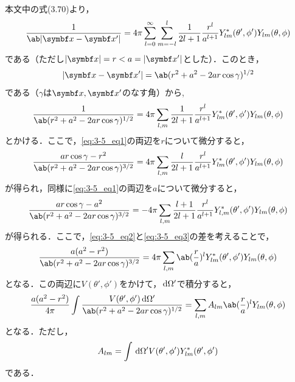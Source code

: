   \hrulefill\\
  本文中の式(3.70)より，
  \begin{gather}%
    \frac{1}{\ab|\bs{x}-\bs{x}'|} = 4\pi \sum_{l=0}^\infty \sum_{m=-l}^l \frac{1}{2l+1}
    \frac{r^l}{a^{l+1}} Y^*_{lm}(\theta',\phi') Y_{lm}(\theta,\phi)
  \end{gather}%
  である（ただし$|\bs{x}| = r < a = |\bs{x}'|$とした）．このとき，
  \begin{gather*}%
    |\bs{x} - \bs{x}'| = \ab(r^2 + a^2 - 2ar\cos\gamma)^{1/2}
  \end{gather*}%
  である（$\gamma$は$\bs{x}, \bs{x}'$のなす角）から,
  \begin{gather}%
    \label{eq:3-5_eq1}
    \frac{1}{\ab(r^2 + a^2 - 2ar \cos\gamma)^{1/2}} = 4\pi\sum_{l,m} \frac{1}{2l+1}
    \frac{r^l}{a^{l+1}} Y^*_{lm}(\theta',\phi') Y_{lm}(\theta,\phi)
  \end{gather}%
  とかける．ここで，\eqref{eq:3-5_eq1}の両辺を$r$について微分すると，
  \begin{gather}%
    \label{eq:3-5_eq2}
    \frac{ar\cos\gamma - r^2}{\ab(r^2+a^2-2ar\cos\gamma)^{3/2}} = 4\pi \sum_{l,m}
    \frac{l}{2l+1} \frac{r^l}{a^{l+1}} Y^*_{lm}(\theta',\phi') Y_{lm}(\theta,\phi)
  \end{gather}%
  が得られ，同様に\eqref{eq:3-5_eq1}の両辺を$a$について微分すると，
  \begin{gather}%
    \label{eq:3-5_eq3}
    \frac{ar\cos\gamma - a^2}{\ab(r^2 + a^2 -2ar\cos\gamma)^{3/2}} = 
    -4\pi\sum_{l,m}\frac{l+1}{2l+1}\frac{r^l}{a^{l+1}}
    Y^*_{l,m}(\theta',\phi') Y_{lm}(\theta,\phi)
  \end{gather}%
  が得られる．ここで，\eqref{eq:3-5_eq2}と\eqref{eq:3-5_eq3}の差を考えることで，
  \begin{gather}%
    \frac{a(a^2 - r^2)}{\ab(r^2 + a^2 - 2ar\cos\gamma)^{3/2}}
    = 4\pi \sum_{l,m} \ab(\frac r a)^l Y^*_{lm}(\theta',\phi') Y_{lm}(\theta,\phi)
  \end{gather}%
  となる．この両辺に$V(\theta',\phi')$をかけて，$\dl{\Omega'}$で積分すると，
  \begin{gather}%
    \frac{a(a^2 - r^2)}{4\pi} \int  
    \frac{V(\theta',\phi')\dl{\Omega'}}{\ab(r^2 + a^2 - 2ar\cos\gamma)^{1/2}} = 
    \sum_{l,m} A_{lm} \ab(\frac ra)^l Y_{lm}(\theta,\phi)
  \end{gather}%
  となる．ただし，
  \begin{gather}%
    A_{lm} = \int \dl{\Omega'} V(\theta',\phi') Y^*_{lm}(\theta',\phi')
  \end{gather}%
  である．
  
